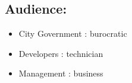 \subsection{Audience:}

\begin{itemize}
\item City Government : burocratic
\item Developers : technician
\item Management : business
\end{itemize}
